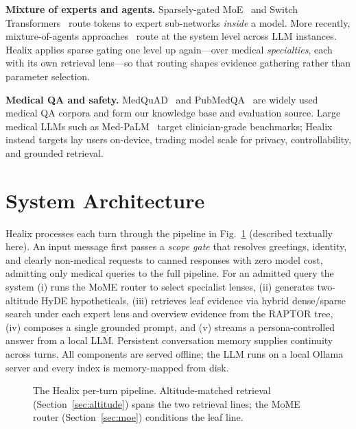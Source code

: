 \documentclass[conference]{IEEEtran}
\begin{document}
\textbf{Mixture of experts and agents.} Sparsely-gated
MoE~\cite{shazeer2017moe} and Switch Transformers~\cite{fedus2022switch} route
tokens to expert sub-networks \emph{inside} a model. More recently,
mixture-of-agents approaches~\cite{wang2024moa} route at the system level across
LLM instances. Healix applies sparse gating one level up again---over medical
\emph{specialties}, each with its own retrieval lens---so that routing shapes
evidence gathering rather than parameter selection.

\textbf{Medical QA and safety.} MedQuAD~\cite{benabacha2019medquad} and
PubMedQA~\cite{jin2019pubmedqa} are widely used medical QA corpora and form our
knowledge base and evaluation source. Large medical LLMs such as
Med-PaLM~\cite{singhal2023medpalm} target clinician-grade benchmarks; Healix
instead targets lay users on-device, trading model scale for privacy,
controllability, and grounded retrieval.

\section{System Architecture}\label{sec:arch}
Healix processes each turn through the pipeline in Fig.~\ref{fig:pipeline}
(described textually here). An input message first passes a \emph{scope gate}
that resolves greetings, identity, and clearly non-medical requests to canned
responses with zero model cost, admitting only medical queries to the full
pipeline. For an admitted query the system (i) runs the MoME router to select
specialist lenses, (ii) generates two-altitude HyDE hypotheticals, (iii)
retrieves leaf evidence via hybrid dense/sparse search under each expert lens and
overview evidence from the RAPTOR tree, (iv) composes a single grounded prompt,
and (v) streams a persona-controlled answer from a local LLM. Persistent
conversation memory supplies continuity across turns. All components are served
offline; the LLM runs on a local Ollama server and every index is memory-mapped
from disk.

\begin{figure}[t]
\centering
{}
\caption{The Healix per-turn pipeline. Altitude-matched retrieval
(Section~\ref{sec:altitude}) spans the two retrieval lines; the MoME router
(Section~\ref{sec:moe}) conditions the leaf line.}
\label{fig:pipeline}
\end{figure}
\end{document}
